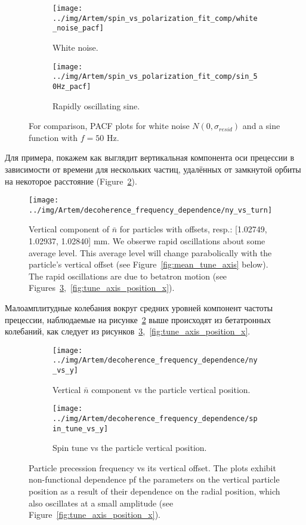 \documentclass{report}
\begin{document}
\begin{figure}[H]
  \centering
  \begin{subfigure}[b]{\textwidth}
    \texttt{[image: ../img/Artem/spin\_vs\_polarization\_fit\_comp/white\_noise\_pacf]}
    \caption{White noise.}
  \end{subfigure}

  \begin{subfigure}[b]{\textwidth}
      \texttt{[image: ../img/Artem/spin\_vs\_polarization\_fit\_comp/sin\_50Hz\_pacf]}
      \caption{Rapidly oscillating sine.}
  \end{subfigure}
  \caption{For comparison, PACF plots for white noise $N(0, \sigma_{resid})$ and a sine function with $f = 50$ Hz.\label{fig:noise_sine_pacf}}
\end{figure}

Для примера, покажем как выглядит вертикальная компонента оси прецессии в зависимости от времени для нескольких частиц, удалённых от замкнутой орбиты на некоторое расстояние (Figure~\ref{fig:ny_vs_turn}).

\begin{figure}[H]
  \centering
  \texttt{[image: ../img/Artem/decoherence\_frequency\_dependence/ny\_vs\_turn]}
  \caption{Vertical component of $\bar n$ for particles with offsets, resp.: [1.02749, 1.02937, 1.02840] mm. We obserwe rapid oscillations about some average level. This average level will change parabolically with the particle's vertical offset (see Figure~\ref{fig:mean_tune_axis} below). The rapid oscillations are due to betatron motion (see Figures~\ref{fig:tune_axis_position_y},~\ref{fig:tune_axis_position_x}).\label{fig:ny_vs_turn}}
\end{figure}

Малоамплитудные колебания вокруг средних уровней компонент частоты прецессии, наблюдаемые на рисунке~\ref{fig:ny_vs_turn} выше происходят из бетатронных колебаний, как следует из рисунков~\ref{fig:tune_axis_position_y},~\ref{fig:tune_axis_position_x}.

\begin{figure}[H]
  \centering
  \begin{subfigure}[b]{\textwidth}
    \texttt{[image: ../img/Artem/decoherence\_frequency\_dependence/ny\_vs\_y]}
    \caption{Vertical $\bar n$ component vs the particle vertical position.}
  \end{subfigure}

  \begin{subfigure}[b]{\textwidth}
    \texttt{[image: ../img/Artem/decoherence\_frequency\_dependence/spin\_tune\_vs\_y]}
    \caption{Spin tune vs the particle vertical position.}
  \end{subfigure}
  \caption{Particle precession frequency vs its vertical offset. The plots exhibit non-functional dependence pf the parameters on the vertical particle position as a result of their dependence on the radial position, which also oscillates at a small amplitude (see Figure~\ref{fig:tune_axis_position_x}). \label{fig:tune_axis_position_y}}
\end{figure}
\end{document}
